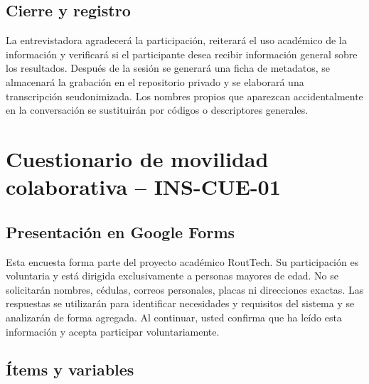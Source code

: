 \documentclass[10pt,a4paper]{article}
\begin{document}
\subsection{Cierre y registro}

La entrevistadora agradecerá la participación, reiterará el uso académico de la información y verificará si el participante desea recibir información general sobre los resultados. Después de la sesión se generará una ficha de metadatos, se almacenará la grabación en el repositorio privado y se elaborará una transcripción seudonimizada. Los nombres propios que aparezcan accidentalmente en la conversación se sustituirán por códigos o descriptores generales.

\section{Cuestionario de movilidad colaborativa -- INS-CUE-01}

\subsection{Presentación en Google Forms}

\begin{InfoBox}
Esta encuesta forma parte del proyecto académico RoutTech. Su participación es voluntaria y está dirigida exclusivamente a personas mayores de edad. No se solicitarán nombres, cédulas, correos personales, placas ni direcciones exactas. Las respuestas se utilizarán para identificar necesidades y requisitos del sistema y se analizarán de forma agregada. Al continuar, usted confirma que ha leído esta información y acepta participar voluntariamente.
\end{InfoBox}

\subsection{Ítems y variables}
\end{document}
